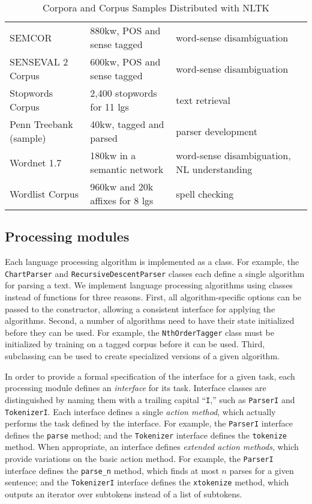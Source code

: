 \documentclass[11pt]{article}
\begin{document}
\begin{table*}
\begin{boxedminipage}{\linewidth}
\begin{tabular}{llll}
SEMCOR &
880kw, POS and sense tagged &
word-sense disambiguation \\

SENSEVAL 2 Corpus &
600kw, POS and sense tagged &
word-sense disambiguation \\

Stopwords Corpus &
2,400 stopwords for 11 lgs &
text retrieval \\

Penn Treebank (sample) &
40kw, tagged and parsed &
parser development \\

Wordnet 1.7 &
180kw in a semantic network &
word-sense disambiguation, NL understanding \\

Wordlist Corpus &
960kw and 20k affixes for 8 lgs &
spell checking
 \\
\end{tabular}
\caption{Corpora and Corpus Samples Distributed with NLTK}\label{tab:data}
\end{boxedminipage}
\end{table*}

\subsection{Processing modules}

Each language processing algorithm is implemented as a class.  For
example, the \texttt{ChartParser} and
\texttt{Recursive\-Descent\-Parser} classes each define a single
algorithm for parsing a text.  We implement language processing
algorithms using classes instead of functions for three reasons.
First, all algorithm-specific options can be passed to the
constructor, allowing a consistent interface for applying the
algorithms.  Second, a number of algorithms need to have their state
initialized before they can be used.  For example, the
\texttt{NthOrderTagger} class must be initialized by training on a
tagged corpus before it can be used.  Third, subclassing can be used
to create specialized versions of a given algorithm.

In order to provide a formal specification of the interface for a
given task, each processing module defines an \emph{interface} for its task.
Interface classes are distinguished by naming them with a trailing
capital ``\texttt{I},'' such as \texttt{ParserI} and
\texttt{TokenizerI}.
Each interface defines a single \emph{action method}, which actually
performs the task defined by the interface.  For example, the
\texttt{ParserI} interface defines the \texttt{parse} method; and the
\texttt{Tokenizer} interface defines the \texttt{tokenize} method.
When appropriate, an interface defines \emph{extended action
  methods}, which provide variations on the basic action method.  For
example, the \texttt{ParserI} interface defines the \texttt{parse\_n}
method, which finds at most $n$ parses for a given sentence; and
the \texttt{TokenizerI} interface defines the \texttt{xtokenize}
method, which outputs an iterator over subtokens instead of a list of
subtokens.
\end{document}
